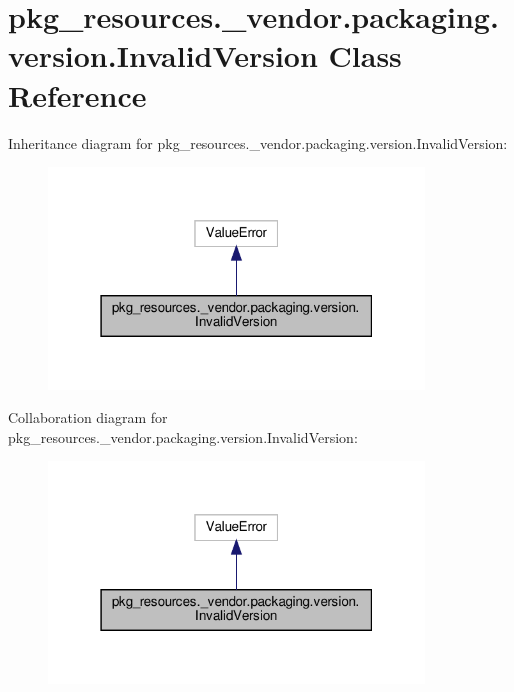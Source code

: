 \hypertarget{classpkg__resources_1_1__vendor_1_1packaging_1_1version_1_1InvalidVersion}{}\section{pkg\+\_\+resources.\+\_\+vendor.\+packaging.\+version.\+Invalid\+Version Class Reference}
\label{classpkg__resources_1_1__vendor_1_1packaging_1_1version_1_1InvalidVersion}


Inheritance diagram for pkg\+\_\+resources.\+\_\+vendor.\+packaging.\+version.\+Invalid\+Version\+:
\nopagebreak
\begin{figure}[H]
\begin{center}
\leavevmode
\includegraphics[width=283pt]{classpkg__resources_1_1__vendor_1_1packaging_1_1version_1_1InvalidVersion__inherit__graph}
\end{center}
\end{figure}


Collaboration diagram for pkg\+\_\+resources.\+\_\+vendor.\+packaging.\+version.\+Invalid\+Version\+:
\nopagebreak
\begin{figure}[H]
\begin{center}
\leavevmode
\includegraphics[width=283pt]{classpkg__resources_1_1__vendor_1_1packaging_1_1version_1_1InvalidVersion__coll__graph}
\end{center}
\end{figure}


